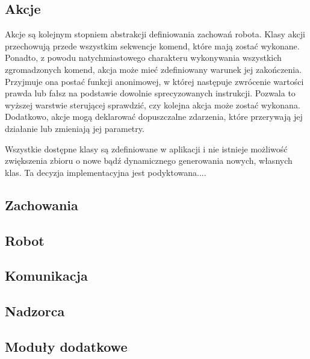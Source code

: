 \subsection{Akcje}
\indent \indent Akcje są kolejnym stopniem abstrakcji definiowania zachowań robota. Klasy akcji przechowują przede wszystkim sekwencje komend, które mają zostać wykonane. Ponadto, z powodu natychmiastowego charakteru wykonywania wszystkich zgromadzonych komend, akcja może mieć zdefiniowany warunek jej zakończenia. Przyjmuje ona postać funkcji anonimowej, w której następuje zwrócenie wartości prawda lub fałsz na podstawie dowolnie sprecyzowanych instrukcji. Pozwala to wyższej warstwie sterującej sprawdzić, czy kolejna akcja może zostać wykonana. Dodatkowo, akcje mogą deklarować dopuszczalne zdarzenia, które przerywają jej działanie lub zmieniają jej parametry.

Wszystkie dostępne klasy są zdefiniowane w aplikacji i nie istnieje możliwość zwiększenia zbioru o nowe bądź dynamicznego generowania nowych, własnych klas. Ta decyzja implementacyjna jest podyktowana....

\subsection{Zachowania}

\subsection{Robot}

\subsection{Komunikacja}

\subsection{Nadzorca}

\subsection{Moduły dodatkowe}
